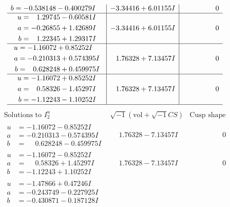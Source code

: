 \documentclass[1p]{elsarticle_modified}
\theoremstyle{definition}
\newcommand{\I}{\sqrt{-1}}
\begin{document}
$$\begin{array}{c|c|c}
\begin{aligned}
b &= -0.538148 - 0.400279 I\end{aligned}
 & -3.34416 + 6.01155 I & \phantom{-0.000000 } 0 \\ \hline\begin{aligned}
u &= \phantom{-}1.29745 - 0.60581 I \\
a &= -0.26855 + 1.42689 I \\
b &= \phantom{-}1.22345 + 1.29317 I\end{aligned}
 & -3.34416 + 6.01155 I & \phantom{-0.000000 } 0 \\ \hline\begin{aligned}
u &= -1.16072 + 0.85252 I \\
a &= -0.210313 + 0.574395 I \\
b &= \phantom{-}0.628248 + 0.459975 I\end{aligned}
 & \phantom{-}1.76328 + 7.13457 I & \phantom{-0.000000 } 0 \\ \hline\begin{aligned}
u &= -1.16072 + 0.85252 I \\
a &= \phantom{-}0.58326 - 1.45297 I \\
b &= -1.12243 - 1.10252 I\end{aligned}
 & \phantom{-}1.76328 + 7.13457 I & \phantom{-0.000000 } 0\\
 \hline 
 \end{array}$$\newpage$$\begin{array}{c|c|c}  
\text{Solutions to }I^u_{2}& \I (\text{vol} + \sqrt{-1}CS) & \text{Cusp shape}\\
 \hline 
\begin{aligned}
u &= -1.16072 - 0.85252 I \\
a &= -0.210313 - 0.574395 I \\
b &= \phantom{-}0.628248 - 0.459975 I\end{aligned}
 & \phantom{-}1.76328 - 7.13457 I & \phantom{-0.000000 } 0 \\ \hline\begin{aligned}
u &= -1.16072 - 0.85252 I \\
a &= \phantom{-}0.58326 + 1.45297 I \\
b &= -1.12243 + 1.10252 I\end{aligned}
 & \phantom{-}1.76328 - 7.13457 I & \phantom{-0.000000 } 0 \\ \hline\begin{aligned}
u &= -1.47866 + 0.47246 I \\
a &= -0.243749 - 0.227925 I \\
b &= -0.430871 - 0.187128 I\end{aligned}

\end{array}$$
\end{document}
